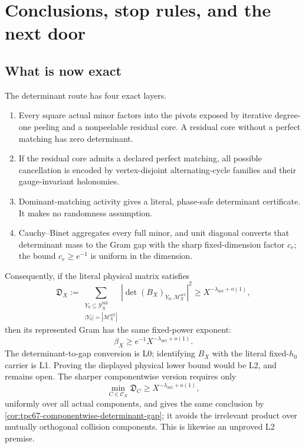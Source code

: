 \section{Conclusions, stop rules, and the next door}

\subsection{What is now exact}
The determinant route has four exact layers.
\begin{enumerate}[label=(\arabic*)]
\item Every square actual minor factors into the pivots exposed by iterative
degree-one peeling and a nonpeelable residual core. A residual core without
a perfect matching has zero determinant.
\item If the residual core admits a declared perfect matching, all possible
cancellation is encoded by vertex-disjoint alternating-cycle families and
their gauge-invariant holonomies.
\item Dominant-matching activity gives a literal, phase-safe determinant
certificate. It makes no randomness assumption.
\item Cauchy--Binet aggregates every full minor, and unit diagonal converts
that determinant mass to the Gram gap with the sharp fixed-dimension factor
\(c_r\); the bound \(c_r\ge e^{-1}\) is uniform in the dimension.
\end{enumerate}

Consequently, if the literal physical matrix satisfies
\[
 \mathfrak D_X
 :=
 \sum_{\substack{Y_0\subseteq\mathcal Y_X^{\mathrm{full}}\\
                  |Y_0|=|\mathcal M_X^{\mathrm{act}}|}}
 |\det (B_X)_{Y_0,\mathcal M_X^{\mathrm{act}}}|^2
 \ge X^{-\lambda_{\det}+o(1)},
\]
then its represented Gram has the same fixed-power exponent:
\[
 \beta_X\ge e^{-1}X^{-\lambda_{\det}+o(1)}.
\]
The determinant-to-gap conversion is L0; identifying \(B_X\) with the literal
fixed-\(h_0\) carrier is L1. Proving the displayed physical lower bound would
be L2, and remains open.
The sharper componentwise version requires only
\[
 \min_{C\in\mathscr C_X}\mathfrak D_C
 \ge X^{-\lambda_{\det}+o(1)},
\]
uniformly over all actual components, and gives the same conclusion by
\cref{cor:tpc67-componentwise-determinant-gap}; it avoids the irrelevant
product over mutually orthogonal collision components. This is likewise an
unproved L2 premise.

